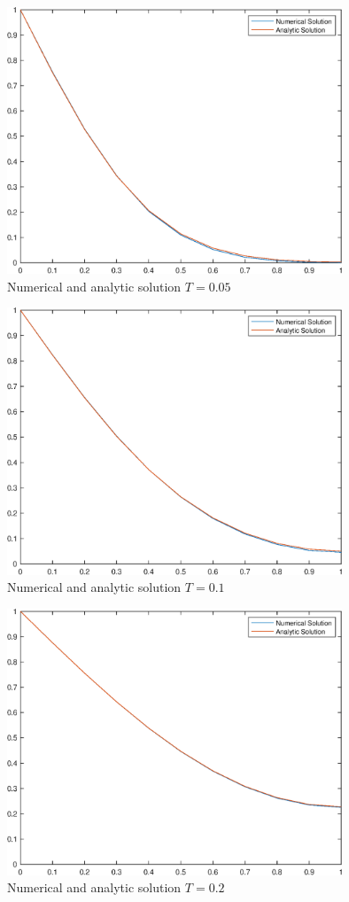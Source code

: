 \documentclass[10pt,a4paper,notitlepage]{article}
\begin{document}
\begin{figure}[H]
\begin{center}
\includegraphics[width=10cm]{Image_3_1}
\caption{Numerical and analytic solution $T=0.05$}
\end{center}
\end{figure}
\begin{figure}[H]
\begin{center}
\includegraphics[width=10cm]{Image_3_2}
\caption{Numerical and analytic solution $T=0.1$}
\end{center}
\end{figure}
\begin{figure}[H]
\begin{center}
\includegraphics[width=10cm]{Image_3_3}
\caption{Numerical and analytic solution $T=0.2$}
\end{center}
\end{figure}
\end{document}
